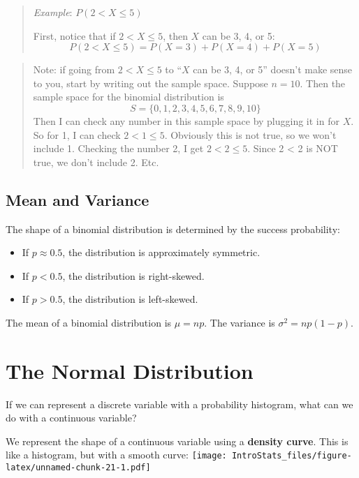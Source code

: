 \documentclass[
]{book}
\providecommand{\tightlist}{%
  \setlength{\itemsep}{0pt}\setlength{\parskip}{0pt}}
\begin{document}
\begin{quote}
\emph{Example}: \(P(2 < X \le 5)\)

First, notice that if \(2 < X \le 5\), then \(X\) can be 3, 4, or 5: \[P(2 < X \le 5) = P(X=3)+P(X=4)+P(X=5)\]
\end{quote}

\begin{quote}
Note: if going from \(2 < X \le 5\) to ``\(X\) can be 3, 4, or 5'' doesn't make sense to you, start by writing out the sample space. Suppose \(n=10\). Then the sample space for the binomial distribution is \[S = \{0, 1, 2, 3, 4, 5, 6, 7, 8, 9, 10\}\] Then I can check any number in this sample space by plugging it in for \(X\). So for 1, I can check \(2 < 1 \le 5\). Obviously this is not true, so we won't include 1. Checking the number 2, I get \(2 < 2 \le 5\). Since 2 \textless{} 2 is NOT true, we don't include 2. Etc.
\end{quote}

\hypertarget{mean-and-variance}{%
\subsection{Mean and Variance}\label{mean-and-variance}}

The shape of a binomial distribution is determined by the success probability:

\begin{itemize}
\tightlist
\item
  If \(p \approx 0.5\), the distribution is approximately symmetric.
\item
  If \(p < 0.5\), the distribution is right-skewed.
\item
  If \(p > 0.5\), the distribution is left-skewed.
\end{itemize}

The mean of a binomial distribution is \(\mu = np\). The variance is \(\sigma^2 = np(1-p)\).

\hypertarget{the-normal-distribution}{%
\section{The Normal Distribution}\label{the-normal-distribution}}

If we can represent a discrete variable with a probability histogram, what can we do with a continuous variable?

We represent the shape of a continuous variable using a \textbf{density curve}. This is like a histogram, but with a smooth curve:
\texttt{[image: IntroStats\_files/figure-latex/unnamed-chunk-21-1.pdf]}
\end{document}
